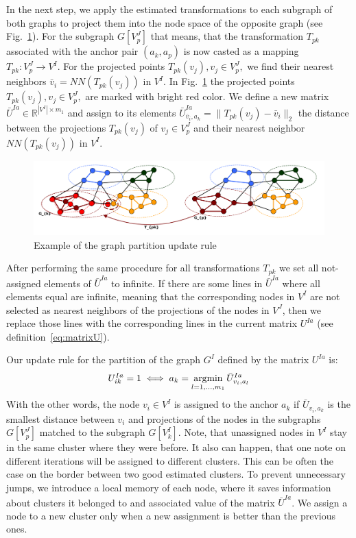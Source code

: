 In the next step, we apply the estimated transformations to each subgraph of both graphs to project them into the node space of the opposite graph (see Fig.~\ref{fig:update}). For the subgraph $G[V^J_p]$ that means, that the transformation $T_{pk}$ associated with the anchor pair $(a_k,a_p)$ is now casted as a mapping $T_{pk}:V^J_p\rightarrow V^I$. For the projected points $T_{pk}(v_j),v_j\in V^J_p,$ we find their nearest neighbors $\bar{v}_i=NN(T_{pk}(v_j))$ in $V^I$. In Fig.~\ref{fig:update} the projected points $T_{pk}(v_j),v_j\in V^J_p,$ are marked with bright red color. We define a new matrix $\bar{U}^{Ia}\in\mathbb{R}^{|V^I|\times m_1}$ and assign to its elements $\bar{U}^{Ia}_{\bar{v}_i,a_k}=\|T_{pk}(v_j)-\bar{v}_i\|_2$ the distance between the projections $T_{pk}(v_j)$ of $v_j\in V^J_p$ and their nearest neighbor $NN(T_{pk}(v_j))$ in $V^I$.

\begin{figure}[h]
	\centering
	\includegraphics[scale=0.35]{chapter2/fig/update.pdf}
	\caption{Example of the graph partition update rule} \label{fig:update}
\end{figure}

After performing the same procedure for all transformations $T_{pk}$ we set all not-assigned elements of $\bar{U}^{Ia}$ to infinite. If there are some lines in $\bar{U}^{Ia}$ where all elements equal are infinite, meaning that the corresponding nodes in $V^I$ are not selected as nearest neighbors of the projections of the nodes in $V^J$,
then we replace those lines with the corresponding lines in the current matrix $U^{Ia}$ (see definition~\eqref{eq:matrixU}).

Our update rule for the partition of the graph $G^I$ defined by the matrix $U^{Ia}$ is:
\begin{equation}
U^{Ia}_{ik}=1 \iff a_k=\mathop{\rm argmin}_{l=1,\dots,m_1}^{}{\bar{U}^{Ia}_{v_i,a_l}}
\end{equation}
With the other words, the node $v_i\in V^I$ is assigned to the anchor $a_k$ if $\bar{U}_{v_i,a_k}$ is the smallest distance between $v_i$ and projections of the nodes in the subgraphs $G[V^J_p]$ matched to the subgraph $G[V^I_k]$. Note, that unassigned nodes in $V^I$ stay in the same cluster where they were before. It also can happen, that one note on different iterations will be assigned to different clusters. This can be often the case on the border between two good estimated clusters. To prevent unnecessary jumps, we introduce a local memory of each node, where it saves information about clusters it belonged to and associated value of the matrix $\bar{U}^{Ia}$. We assign a node to a new cluster only when a new assignment is better than the previous ones.

